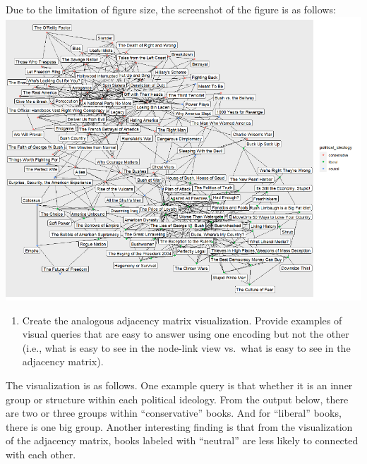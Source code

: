\documentclass[
]{article}
\newenvironment{Shaded}{\begin{snugshade}}{\end{snugshade}}
\newcommand{\CommentTok}[1]{\textcolor[rgb]{0.56,0.35,0.01}{\textit{#1}}}
\providecommand{\tightlist}{%
  \setlength{\itemsep}{0pt}\setlength{\parskip}{0pt}}
\begin{document}
\begin{Shaded}
\end{Shaded}

Due to the limitation of figure size, the screenshot of the figure is as
follows: \includegraphics{graph.png}

\begin{enumerate}
\def\labelenumi{\alph{enumi}.}
\setcounter{enumi}{2}
\tightlist
\item
  Create the analogous adjacency matrix visualization. Provide examples
  of visual queries that are easy to answer using one encoding but not
  the other (i.e., what is easy to see in the node-link view vs.~what is
  easy to see in the adjacency matrix).
\end{enumerate}

The visualization is as follows. One example query is that whether it is
an inner group or structure within each political ideology. From the
output below, there are two or three groups within ``conservative''
books. And for ``liberal'' books, there is one big group. Another
interesting finding is that from the visualization of the adjacency
matrix, books labeled with ``neutral'' are less likely to connected with
each other.
\end{document}
